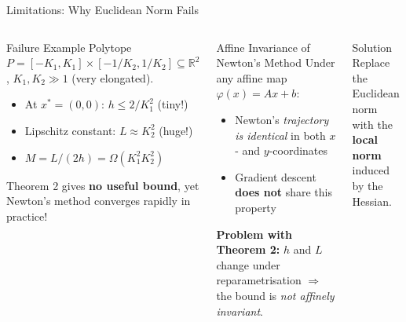 \documentclass[aspectratio=169,10pt]{beamer}
\newcommand{\R}{\mathbb{R}}
\begin{document}
\begin{frame}{Limitations: Why Euclidean Norm Fails}
  \begin{columns}[T]
      \begin{alertblock}{Failure Example}
        Polytope $P=[-K_1,K_1]\times[-1/K_2,1/K_2]\subseteq\R^2$,
        $K_1, K_2\gg 1$ (very elongated).
        \vspace{0.2em}
        \begin{itemize}
          \item At $x^*=(0,0)$: $h \le 2/K_1^2$ (tiny!)
          \item Lipschitz constant: $L \approx K_2^2$ (huge!)
          \item $M = L/(2h) = \Omega(K_1^2 K_2^2)$
        \end{itemize}
        \vspace{0.2em}
        Theorem 2 gives \textbf{no useful bound}, yet\\
        Newton's method converges rapidly in practice!
      \end{alertblock}

      \begin{block}{Affine Invariance of Newton's Method}
        Under any affine map $\varphi(x)=Ax+b$:
        \begin{itemize}
          \item Newton's \emph{trajectory is identical}
                in both $x$- and $y$-coordinates
          \item Gradient descent \textbf{does not} share this property
        \end{itemize}
        \vspace{0.3em}
        \textbf{Problem with Theorem 2:}
        $h$ and $L$ change under reparametrisation
        $\Rightarrow$ the bound is \emph{not affinely invariant}.
      \end{block}
      \vspace{0.3em}
      \begin{exampleblock}{Solution}
        Replace the Euclidean norm with the\\
        \textbf{local norm} induced by the Hessian.
      \end{exampleblock}
  \end{columns}
\end{frame}

\end{document}
